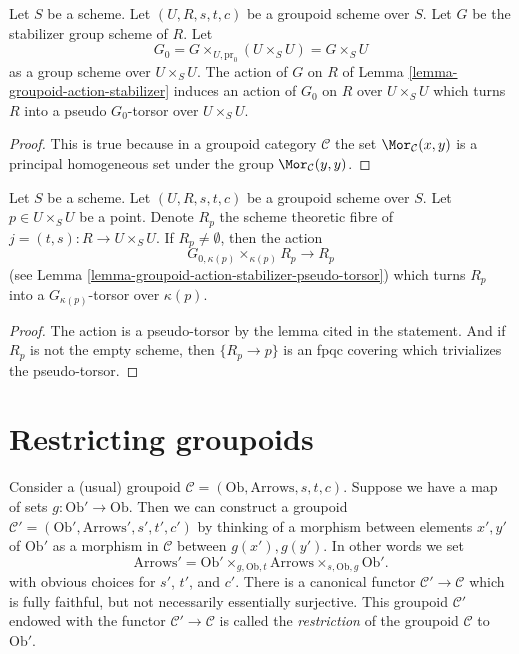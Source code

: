 \begin{lemma}
\label{lemma-groupoid-action-stabilizer-pseudo-torsor}
Let $S$ be a scheme. Let $(U, R, s, t, c)$ be a groupoid scheme
over $S$. Let $G$ be the stabilizer group scheme of $R$.
Let
$$
G_0 = G \times_{U, \text{pr}_0} (U \times_S U) = G \times_S U
$$
as a group scheme over $U \times_S U$. The action of $G$ on $R$ of
Lemma \ref{lemma-groupoid-action-stabilizer}
induces an action of $G_0$ on $R$ over $U \times_S U$
which turns $R$ into a pseudo $G_0$-torsor over $U \times_S U$.
\end{lemma}

\begin{proof}
This is true because in a groupoid category $\mathcal{C}$ the set
$\Mor_\mathcal{C}(x, y)$ is a principal homogeneous set
under the group $\Mor_\mathcal{C}(y, y)$.
\end{proof}

\begin{lemma}
\label{lemma-fibres-j}
Let $S$ be a scheme. Let $(U, R, s, t, c)$ be a groupoid scheme over $S$.
Let $p \in U \times_S U$ be a point. Denote
$R_p$ the scheme theoretic fibre of $j = (t, s) : R \to U \times_S U$.
If $R_p \not = \emptyset$, then the action
$$
G_{0, \kappa(p)} \times_{\kappa(p)} R_p \longrightarrow R_p
$$
(see
Lemma \ref{lemma-groupoid-action-stabilizer-pseudo-torsor})
which turns $R_p$ into a $G_{\kappa(p)}$-torsor over $\kappa(p)$.
\end{lemma}

\begin{proof}
The action is a pseudo-torsor by the lemma cited in the statement.
And if $R_p$ is not the empty scheme, then $\{R_p \to p\}$
is an fpqc covering which trivializes the pseudo-torsor.
\end{proof}







\section{Restricting groupoids}
\label{section-restrict-groupoid}

\noindent
Consider a (usual) groupoid
$\mathcal{C} = (\text{Ob}, \text{Arrows}, s, t, c)$.
Suppose we have a map of sets $g : \text{Ob}' \to \text{Ob}$.
Then we can construct a groupoid
$\mathcal{C}' = (\text{Ob}', \text{Arrows}', s', t', c')$
by thinking of a morphism between elements $x', y'$ of $\text{Ob}'$
as a morphism in $\mathcal{C}$ between $g(x'), g(y')$.
In other words we set
$$
\text{Arrows}' =
\text{Ob}'
\times_{g, \text{Ob}, t}
\text{Arrows}
\times_{s, \text{Ob}, g}
\text{Ob}'.
$$
with obvious choices for $s'$, $t'$, and $c'$. There is a canonical
functor $\mathcal{C}' \to \mathcal{C}$ which is fully faithful,
but not necessarily essentially surjective. This groupoid $\mathcal{C}'$
endowed with the functor $\mathcal{C}' \to \mathcal{C}$
is called the {\it restriction} of the groupoid
$\mathcal{C}$ to $\text{Ob}'$.

